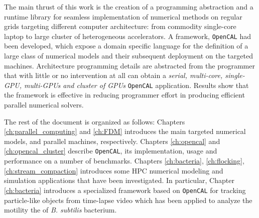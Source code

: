 The main thrust of this work is the creation of a programming abstraction and a runtime library for seamless implementation of numerical methods on regular grids targeting different computer architecture: from commodity single-core laptop to large cluster of heterogeneous accelerators. A framework, \texttt{OpenCAL} had been developed, which expose a domain specific language for the definition of a large class of numerical models and their subsequent deployment on the targeted machines. Architecture programming details are abstracted from the programmer that with little or no intervention at all can obtain a \textit{serial, multi-core, single-GPU, multi-GPUs and cluster of GPUs} \texttt{OpenCAL} application. 
Results show that the framework is effective in reducing programmer effort in producing efficient parallel numerical solvers.

The rest of the document is organized as follows:
Chapters \ref{ch:parallel_computing} and  \ref{ch:FDM} introduces the main targeted numerical models, and parallel machines, respectively.
Chapters \ref{ch:opencal} and \ref{ch:opencal_cluster} describe \texttt{OpenCAL}, its implementation, usage and performance on a number of benchmarks.
Chapters \ref{ch:bacteria}, \ref{ch:flocking}, \ref{ch:stream_compaction} introduces some HPC numerical modeling and simulation applications that have been investigated.
In particular, Chapter \ref{ch:bacteria} introduces a specialized framework based on \texttt{OpenCAL} for tracking particle-like objects from time-lapse video which has been applied to analyze the motility  the of \textit{B. subtilis} bacterium.